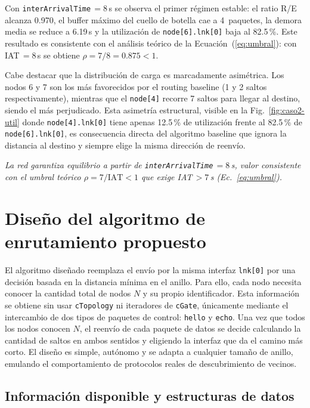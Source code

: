 \documentclass[10pt,letterpaper,twocolumn]{article}
\begin{document}
Con \texttt{interArrivalTime}\,$=8$\,s se observa el primer régimen
estable: el ratio R/E alcanza 0.970, el buffer máximo del cuello de
botella cae a 4~paquetes, la demora media se reduce a 6.19\,s y la
utilización de \texttt{node[6].lnk[0]} baja al 82.5\,\%. Este resultado
es consistente con el análisis teórico de la
Ecuación~(\ref{eq:umbral}): con IAT\,$=8$\,s se obtiene
$\rho = 7/8 = 0.875 < 1$.

Cabe destacar que la distribución de carga es marcadamente asimétrica.
Los nodos 6 y 7 son los más favorecidos por el routing baseline (1 y 2
saltos respectivamente), mientras que el \texttt{node[4]} recorre 7
saltos para llegar al destino, siendo el más perjudicado. Esta asimetría
estructural, visible en la Fig.~\ref{fig:caso2-util} donde
\texttt{node[4].lnk[0]} tiene apenas 12.5\,\% de utilización frente al
82.5\,\% de \texttt{node[6].lnk[0]}, es consecuencia directa del
algoritmo baseline que ignora la distancia al destino y siempre elige
la misma dirección de reenvío.

\textit{La red garantiza equilibrio a partir de
\texttt{interArrivalTime}\,$=8$\,s, valor consistente con el umbral
teórico $\rho = 7/\mathrm{IAT} < 1$ que exige IAT\,$> 7$\,s
(Ec.~\ref{eq:umbral}).}

\section{Diseño del algoritmo de enrutamiento propuesto}
\label{sec:diseno}

El algoritmo diseñado reemplaza el envío por la misma interfaz \texttt{lnk[0]} por una
decisión basada en la distancia mínima en el anillo. Para ello, cada nodo necesita
conocer la cantidad total de nodos \(N\) y su propio identificador. Esta información
se obtiene sin usar \texttt{cTopology} ni iteradores de \texttt{cGate}, únicamente
mediante el intercambio de dos tipos de paquetes de control: \texttt{hello} y
\texttt{echo}. Una vez que todos los nodos conocen \(N\), el reenvío de cada paquete
de datos se decide calculando la cantidad de saltos en ambos sentidos y eligiendo la
interfaz que da el camino más corto. El diseño es simple, autónomo y se adapta a
cualquier tamaño de anillo, emulando el comportamiento de protocolos reales de
descubrimiento de vecinos.

\subsection{Información disponible y estructuras de datos}
\end{document}
